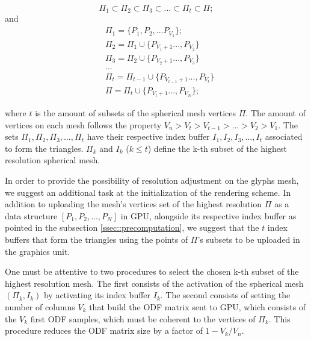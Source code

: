 \documentclass[twoside,twocolumn,10pt]{article}
\begin{document}
\begin{equation}
\label{eq::subset_condition1}
    \Pi_{1} \subset \Pi_{2} \subset \Pi_{3} \subset ... \subset \Pi_{t} \subset \Pi;
\end{equation}
and
\begin{align}
 \label{eq::subset_condition2}
    &\Pi_{1} = \{P_1, P_2,... P_{V_1}\}; \nonumber\\
    &\Pi_{2} = \Pi_1 \cup \{ P_{V_1+1}..., P_{V_2}\} \nonumber\\
    &\Pi_{3} = \Pi_2 \cup \{ P_{V_2+1}..., P_{V_3}\} \nonumber\\
    &... \\
    &\Pi_{t} = \Pi_{t-1} \cup \{ P_{V_{t-1}+1}..., P_{V_t}\} \nonumber\\
    &\Pi = \Pi_{t} \cup \{ P_{V_t+1}..., P_{V_N}\}; \nonumber
\end{align}


where $t$ is the amount of subsets of the spherical mesh vertices $\Pi$. The amount of vertices on each mesh follows the property $V_n > V_t > V_{t-1} > ... > V_2 > V_1$. The sets $\Pi_{1}, \Pi_{2}, \Pi_{3}, ..., \Pi_{t}$ have their respective index buffer $I_{1}, I_{2}, I_{3}, ..., I_{t}$ associated to form the triangles. $\Pi_k$ and $I_k$ ($k \leq t$) define the k-th subset of the highest resolution spherical mesh.

In order to provide the possibility of resolution adjustment on the glyphs mesh, we suggest an additional task at the initialization of the rendering scheme. In addition to uploading the mesh's vertices set of the highest resolution $\Pi$ as a data structure $[P_1, P_2, ..., P_N]$ in GPU, alongside its respective index buffer as pointed in the subsection \ref{ssec::precomputation}, we suggest that the $t$ index buffers that form the triangles using the points of $\Pi$'s subsets to be uploaded in the graphics unit.


One must be attentive to two procedures to select the chosen k-th subset of the highest resolution mesh. The first consists of the activation of the spherical mesh $(\Pi_k, I_k)$ by activating its index buffer $I_k$. The second consists of setting the number of columns $V_k$ that build the ODF matrix sent to GPU, which consists of the $V_k$ first ODF samples, which must be coherent to the vertices of $\Pi_k$. This procedure reduces the ODF matrix size by a factor of $1-V_k/V_n$.
\end{document}
